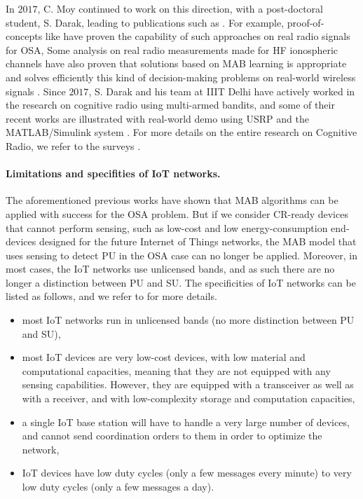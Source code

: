 In $2017$, C. Moy continued to work on this direction, with a post-doctoral student, S. Darak, leading to publications such as
\cite{darak2016bayesian,Darak16}.
%
For example, proof-of-concepts like \cite{kumar2016two} have proven the capability of such approaches on real radio signals for OSA,
%
Some analysis on real radio measurements made for HF ionospheric channels have also proven that solutions based on MAB learning is appropriate and solves efficiently this kind of decision-making problems on real-world wireless signals \cite{Melian15}.
%
Since $2017$, S. Darak and his team at IIIT Delhi have actively worked in the research on cognitive radio using multi-armed bandits, and some of their recent works are illustrated with real-world demo using USRP and the MATLAB/Simulink system
\cite{KumarYadav2018,SawantKumar2018,JoshiKumar2018}.
%
For more details on the entire research on Cognitive Radio, we refer to the surveys \cite{garhwal2012survey,marinho2012cognitive}.



\paragraph{Limitations and specifities of IoT networks.}
%
The aforementioned previous works have shown that MAB algorithms can be applied with success for the OSA problem.
But if we consider CR-ready devices that cannot perform sensing, such as low-cost and low energy-consumption end-devices designed for the future Internet of Things networks, the MAB model that uses sensing to detect PU in the OSA case can no longer be applied.
Moreover, in most cases, the IoT networks use unlicensed bands, and as such there are no longer a distinction between PU and SU.
%
The specificities of IoT networks can be listed as follows,
and we refer to \cite{Centenaro16} for more details.
\begin{itemize}\tightlist
    \item
    most IoT networks run in unlicensed bands (no more distinction between PU and SU),
    \item
    most IoT devices are very low-cost devices, with low material and computational capacities,
    meaning that they are not equipped with any sensing capabilities.
    However, they are equipped with a transceiver as well as with a receiver,
    and with low-complexity storage and computation capacities,
    \item
    a single IoT base station will have to handle a very large number of devices,
    and cannot send coordination orders to them in order to optimize the network,
    \item
    IoT devices have low duty cycles (only a few messages every minute) to very low duty cycles (only a few messages a day).
\end{itemize}


